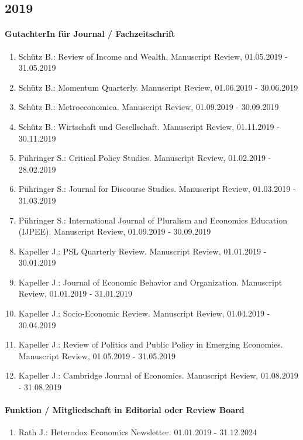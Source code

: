 \subsection*{2019} 
\paragraph{GutachterIn für Journal / Fachzeitschrift} 
\begin{enumerate}[leftmargin=*, labelsep=0.5cm] 
 	 \item Schütz B.: Review of Income and Wealth. Manuscript Review, 01.05.2019 - 31.05.2019 
	 \item Schütz B.: Momentum Quarterly. Manuscript Review, 01.06.2019 - 30.06.2019 
	 \item Schütz B.: Metroeconomica. Manuscript Review, 01.09.2019 - 30.09.2019 
	 \item Schütz B.: Wirtschaft und Gesellschaft. Manuscript Review, 01.11.2019 - 30.11.2019 
	 \item Pühringer S.: Critical Policy Studies. Manuscript Review, 01.02.2019 - 28.02.2019 
	 \item Pühringer S.: Journal for Discourse Studies. Manuscript Review, 01.03.2019 - 31.03.2019 
	 \item Pühringer S.: International Journal of Pluralism and Economics Education (IJPEE). Manuscript Review, 01.09.2019 - 30.09.2019 
	 \item Kapeller J.: PSL Quarterly Review. Manuscript Review, 01.01.2019 - 30.01.2019 
	 \item Kapeller J.: Journal of Economic Behavior and Organization. Manuscript Review, 01.01.2019 - 31.01.2019 
	 \item Kapeller J.: Socio-Economic Review. Manuscript Review, 01.04.2019 - 30.04.2019 
	 \item Kapeller J.: Review of Politics and Public Policy in Emerging Economies. Manuscript Review, 01.05.2019 - 31.05.2019 
	 \item Kapeller J.: Cambridge Journal of Economics. Manuscript Review, 01.08.2019 - 31.08.2019 
\end{enumerate} 
\paragraph{Funktion / Mitgliedschaft in Editorial oder Review Board} 
\begin{enumerate}[leftmargin=*, labelsep=0.5cm] 
 	 \item Rath J.: Heterodox Economics Newsletter. 01.01.2019 - 31.12.2024 
\end{enumerate} 

